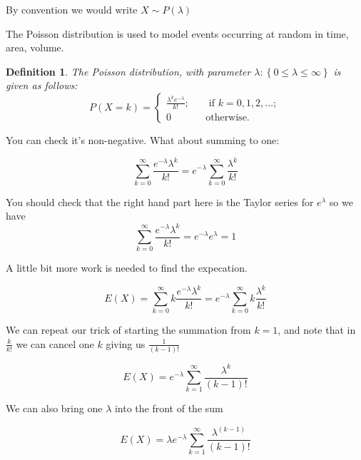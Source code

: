 \documentclass[12pt]{extbook}
\newtheorem{df}{Definition}[section]
\begin{document}
{\color{green}By convention we would write $X \sim P(\lambda)$} 

The Poisson distribution is used to model events occurring at random in time, area, volume.

\begin{df}
The Poisson distribution, with parameter $\lambda: \left\{0 \leq \lambda \leq \infty \right\}$ is given as follows:
\begin{displaymath}
P(X=k) = \left\{ \begin{array}{crr} \frac{\lambda^k e^{-\lambda}}{k!}; & & \mbox{ if } k=0,1,2,\ldots; \\ 0 & & \mbox{otherwise.} \end{array} \right.
\end{displaymath}
\end{df}



You can check it's non-negative.   What about summing to one:

\begin{displaymath}
\sum_{k=0}^{\infty} \frac{e^{-\lambda}\lambda^k}{k!} = e^{-\lambda} \sum_{k=0}^{\infty} \frac{\lambda^k}{k!}
\end{displaymath}

You should check that the right hand part here is the Taylor series for $e^{\lambda}$ so we have
\begin{displaymath}
\sum_{k=0}^{\infty} \frac{e^{-\lambda}\lambda^k}{k!} = e^{-\lambda}e^{\lambda} = 1
\end{displaymath}



A little bit more work is needed to find the expecation.

\begin{displaymath}
E(X) = \sum_{k=0}^{\infty} k \frac{e^{-\lambda}\lambda^k}{k!} = e^{-\lambda} \sum_{k=0}^{\infty} k \frac{\lambda^k}{k!}
\end{displaymath}

We can repeat our trick of starting the summation from $k=1$, and note that in $\frac{k}{k!}$ we can cancel one $k$ giving us $\frac{1}{(k-1)!}$

\begin{displaymath}
E(X)  = e^{-\lambda} \sum_{k=1}^{\infty}  \frac{\lambda^k}{(k-1)!}
\end{displaymath}

We can also bring one $\lambda$ into the front of the sum

\begin{displaymath}
E(X)  = \lambda e^{-\lambda} \sum_{k=1}^{\infty}  \frac{\lambda^{(k-1)}}{(k-1)!}
\end{displaymath}
\end{document}
